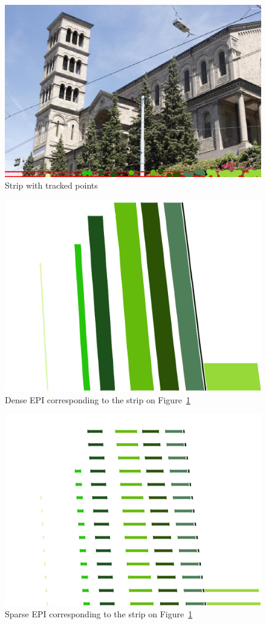 \begin{itemize}
\begin{figure}[h!]
\centering
\includegraphics[width = 0.7 \textwidth]{./Diagrams/results/EPIs/673_10_102_4_48_8_strip.png}
\caption{Strip with tracked points}
\label{fig:strip5}
\end{figure}

\begin{figure}[h!]
\centering
\includegraphics[width = 0.7 \textwidth]{./Diagrams/results/EPIs/673_10_102_7_48_8_dense.png}
\caption{Dense EPI corresponding to the strip on Figure~\ref{fig:strip5}}
\label{fig:dense5}
\end{figure}

\begin{figure}[h!]
\centering
\includegraphics[width = 0.7 \textwidth]{./Diagrams/results/EPIs/673_10_102_7_48_8_sparse.png}
\caption{Sparse EPI corresponding to the strip on Figure~\ref{fig:strip5}}
\label{fig:sparse5}
\end{figure}


\end{itemize}
